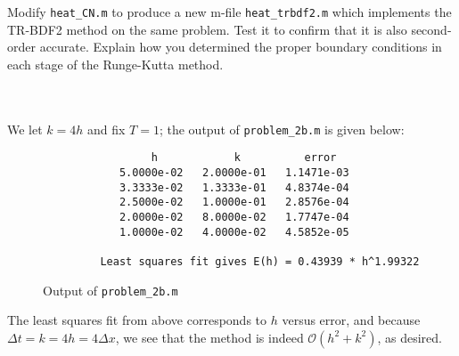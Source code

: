 Modify \texttt{heat\_CN.m} to produce a new m-file \texttt{heat\_trbdf2.m} which implements the TR-BDF2 method on the
same problem. Test it to confirm that it is also second-order accurate. Explain how you determined the proper boundary
conditions in each stage of the Runge-Kutta method.

\begin{solution}\ \\\\
    We let $k = 4h$ and fix $T = 1$; the output of \texttt{problem\_2b.m} is given below:

    \begin{figure}[h]
        \centering
        \begin{verbatim}
                 h            k          error
            5.0000e-02   2.0000e-01   1.1471e-03
            3.3333e-02   1.3333e-01   4.8374e-04
            2.5000e-02   1.0000e-01   2.8576e-04
            2.0000e-02   8.0000e-02   1.7747e-04
            1.0000e-02   4.0000e-02   4.5852e-05
          
         Least squares fit gives E(h) = 0.43939 * h^1.99322
        \end{verbatim}
        \caption{Output of \texttt{problem\_2b.m}}
    \end{figure}

    The least squares fit from above corresponds to $h$ versus error, and because \linebreak
    $\Delta t = k = 4h = 4 \Delta x$, we see that the  method is indeed \linebreak
    $\mathcal{O}\left(h^2 + k^2\right)$, as desired.
    \ \\
\end{solution}
